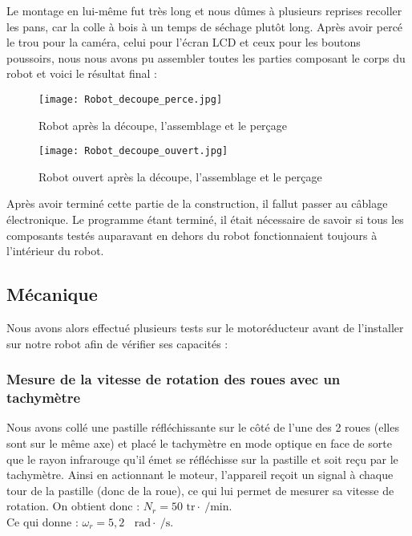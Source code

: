 \documentclass[12pt,a4paper]{article}
\begin{document}
	Le montage en lui-même fut très long et nous dûmes à plusieurs reprises recoller les pans, car la colle à bois à un temps de séchage plutôt long.
Après avoir percé le trou pour la caméra, celui pour l’écran LCD et ceux pour les boutons poussoirs, nous nous avons pu assembler toutes les parties composant le corps du robot et voici le résultat final :

	\begin{figure}[ht!]
		\centering
			\texttt{[image: Robot\_decoupe\_perce.jpg]}
			\caption{Robot après la découpe, l'assemblage et le perçage\label{overflow}}
	\end{figure}
	
	\begin{figure}[ht!]
		\centering
			\texttt{[image: Robot\_decoupe\_ouvert.jpg]}
			\caption{Robot ouvert après la découpe, l'assemblage et le perçage\label{overflow}}
	\end{figure}
	
	Après avoir terminé cette partie de la construction, il fallut passer au câblage électronique. Le programme étant terminé, il était nécessaire de savoir si tous les composants testés auparavant en dehors du robot fonctionnaient toujours à l’intérieur du robot.
	\subsection{Mécanique}
	
\indent \indent Nous avons 	alors effectué plusieurs tests sur le motoréducteur avant de  l’installer sur notre robot afin de vérifier ses capacités :

\subsubsection{Mesure de la vitesse de rotation des roues avec un tachymètre}

\indent \indent Nous avons collé une pastille réfléchissante sur le côté de l’une des 2 roues (elles sont sur le même axe) et placé le tachymètre en mode optique en face de sorte que le rayon infrarouge qu’il émet se réfléchisse sur la pastille et soit reçu par le tachymètre. Ainsi en actionnant le moteur, l’appareil reçoit un signal à chaque tour de la pastille (donc de la roue), ce qui lui permet de mesurer sa vitesse de rotation. On obtient donc : $N_r = 50 \text{ tr}\cdot\SI{}{\per\minute}$.\\
Ce qui donne : $\omega_r = 5,2 \text{ }\SI{}{\radian} \cdot \SI{}{\per\second}$.
\end{document}
